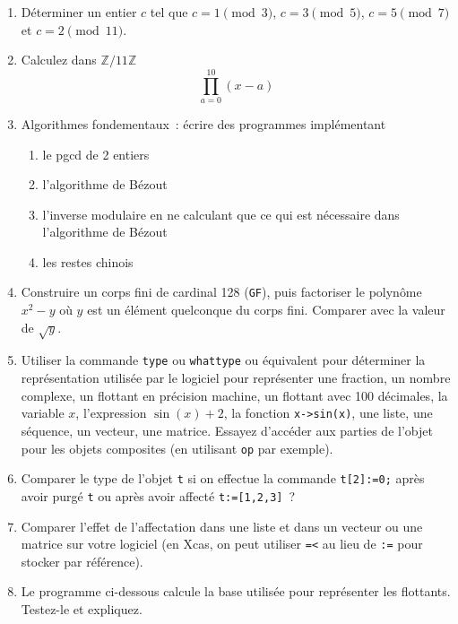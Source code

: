 \documentclass[a4paper,11pt]{book}
\begin{document}
\begin{giacjshere}
\begin{enumerate}
\item D\'eterminer un entier $c$ tel que $c=1 \pmod 3$, 
$c=3 \pmod 5$, $c=5 \pmod 7$ et $c=2 \pmod{11}$.
\item Calculez dans $\mathbb{Z}/11\mathbb{Z}$
\[  \prod_{a=0}^{10} (x-a)\]
\item Algorithmes fondementaux~: \'ecrire des programmes impl\'ementant
\begin{enumerate}
\item le pgcd de 2 entiers
\item l'algorithme de B\'ezout
\item l'inverse modulaire en ne calculant que ce qui est n\'ecessaire
dans l'algorithme de B\'ezout
\item les restes chinois
\end{enumerate}

\item Construire un corps fini de cardinal 128 (\verb|GF|), puis factoriser
le polyn\^ome $x^2-y$ o\`u $y$ est un \'el\'ement quelconque du corps
fini.
Comparer avec la valeur de $\sqrt{y}$.
\item Utiliser la commande {\tt type} ou {\tt whattype} ou \'equivalent
pour d\'eterminer la repr\'esentation
utilis\'ee par le logiciel pour repr\'esenter
une fraction, un nombre complexe, un flottant en pr\'ecision machine, 
un flottant avec 100 d\'ecimales, la variable $x$, l'expression $\sin(x)+2$,
la fonction {\tt x->sin(x)}, une liste, une s\'equence, un vecteur,
une matrice. Essayez d'acc\'eder aux parties de
l'objet pour les objets composites (en utilisant {\tt op} par exemple).
\item Comparer le type de l'objet \verb|t| si on effectue
la commande \verb|t[2]:=0;| apr\`es avoir purg\'e \verb|t|
ou apr\`es avoir affect\'e \verb|t:=[1,2,3]|~?
\item Comparer l'effet de l'affectation dans une liste et dans un
  vecteur ou une matrice sur votre logiciel (en Xcas, on peut utiliser
\verb|=<| au lieu de \verb|:=| pour stocker par r\'ef\'erence).
\item Le programme ci-dessous calcule la base utilis\'ee
pour repr\'esenter les flottants. 
Testez-le  et expliquez.


\end{enumerate}
\end{giacjshere}
\end{document}
